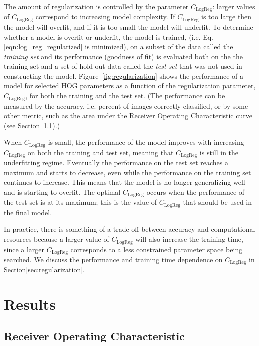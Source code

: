 \documentclass{emulateapj}
\begin{document}
The amount of regularization is controlled by the parameter
$C_\text{LogReg}$: larger values of $C_\text{LogReg}$ correspond to
increasing model complexity.  If $C_\text{LogReg}$ is too large then
the model will overfit, and if it is too small the model will
underfit.  To determine whether a model is overfit or underfit, the
model is trained, (i.e. Eq. \ref{eqn:log_reg_regularized} is
minimized), on a subset of the data called the {\em{training set}} and
its performance (goodness of fit) is evaluated both on the the
training set and a set of hold-out data called the {\em{test set}}
that was not used in constructing the model.
Figure~\ref{fig:regularization} shows the performance of a model for
selected HOG parameters as a function of the regularization parameter,
$C_\text{LogReg}$, for both the training and the test set.  (The
performance can be measured by the accuracy, i.e. percent of images
correctly classified, or by some other metric, such as the area under
the Receiver Operating Characteristic curve (see
Section~\ref{sec:ROC}).)

When $C_\text{LogReg}$ is small, the performance of the model improves
with increasing $C_\text{LogReg}$ on both the training and test set,
meaning that $C_\text{LogReg}$ is
still in the underfitting regime. Eventually the performance on the
test set reaches a maximum and starts to decrease, even while the
performance on the training set continues to increase.  This means
that the model is no longer generalizing well and is starting to
overfit. The optimal $C_\text{LogReg}$ occurs when the performance
of the test set is at its maximum; this is the value of $C_\text{LogReg}$
that should be used in the final model.

In practice, there is something of a trade-off between accuracy and
computational resources because a larger value of $C_\text{LogReg}$
will also increase the training time, since a larger $C_\text{LogReg}$
corresponds to a less constrained parameter space being searched.
We discuss the performance and training time dependence on $C_\text{LogReg}$
in Section\ref{sec:regularization}.

\section{Results}
\label{sec:results}

\subsection{Receiver Operating Characteristic}\label{sec:ROC}
\end{document}
